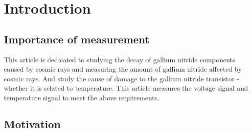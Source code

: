 \chapter{Introduction}
\label{chap:Introduction}
 
\section{Importance of measurement}
\label{Importance of measurement}
This article is dedicated to studying the decay of gallium nitride components caused by cosmic rays and measuring the amount of gallium nitride affected by cosmic rays. And study the cause of damage to the gallium nitride transistor - whether it is related to temperature. This article measures the voltage signal and temperature signal to meet the above requirements.

\section{Motivation}
\label{Motivation}




